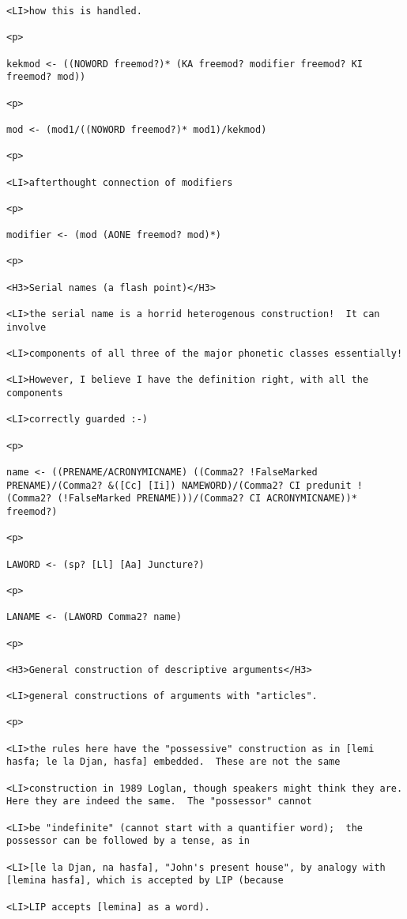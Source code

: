 \documentclass[12pt]{article}
\begin{document}
\begin{lstlisting}
<LI>how this is handled.

<p>

kekmod <- ((NOWORD freemod?)* (KA freemod? modifier freemod? KI freemod? mod))

<p>

mod <- (mod1/((NOWORD freemod?)* mod1)/kekmod)

<p>

<LI>afterthought connection of modifiers

<p>

modifier <- (mod (AONE freemod? mod)*)

<p>

<H3>Serial names (a flash point)</H3>

<LI>the serial name is a horrid heterogenous construction!  It can involve

<LI>components of all three of the major phonetic classes essentially!

<LI>However, I believe I have the definition right, with all the components

<LI>correctly guarded :-)

<p>

name <- ((PRENAME/ACRONYMICNAME) ((Comma2? !FalseMarked PRENAME)/(Comma2? &([Cc] [Ii]) NAMEWORD)/(Comma2? CI predunit !(Comma2? (!FalseMarked PRENAME)))/(Comma2? CI ACRONYMICNAME))* freemod?)

<p>

LAWORD <- (sp? [Ll] [Aa] Juncture?)

<p>

LANAME <- (LAWORD Comma2? name)

<p>

<H3>General construction of descriptive arguments</H3>

<LI>general constructions of arguments with "articles".

<p>

<LI>the rules here have the "possessive" construction as in [lemi hasfa; le la Djan, hasfa] embedded.  These are not the same

<LI>construction in 1989 Loglan, though speakers might think they are.  Here they are indeed the same.  The "possessor" cannot

<LI>be "indefinite" (cannot start with a quantifier word);  the possessor can be followed by a tense, as in

<LI>[le la Djan, na hasfa], "John's present house", by analogy with [lemina hasfa], which is accepted by LIP (because

<LI>LIP accepts [lemina] as a word).


\end{lstlisting}
\end{document}
